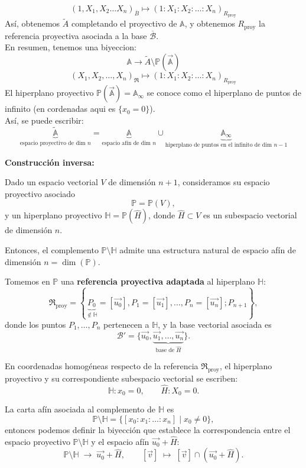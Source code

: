 \[
(1, X_1, X_2 \ldots X_n)_{\overline{B}} \mapsto 
(1 : X_1 : X_2 : \ldots : X_n)_{R_{\text{proy}}}
\]
Así, obtenemos $\widetilde{A}$ completando el proyectivo de $\mathbb{A}$, y obtenemos $R_{\text{proy}}$ la referencia proyectiva asociada a la base $\overline{\mathcal{B}}$.\\
En resumen, tenemos una biyeccion:
\[
\mathbb{A} \to \widetilde{A} \setminus \mathbb{P}(\vec{\mathbb{A}})
\]
\[
(X_1, X_2, \ldots, X_n)_{\mathfrak{R}} \mapsto 
(1 : X_1 : X_2 : \ldots : X_n)_{R_{\text{proy}}}
\]
El hiperplano proyectivo $\mathbb{P}(\vec{\mathbb{A}}) = \mathbb{A}_{\infty}$ se conoce como el hiperplano de puntos de infinito (en cordenadas aqui es $\{x_0 = 0\}$).\\
Así, se puede escribir:
\[
\underbrace{\widetilde{\mathbb{A}}}_{\text{espacio proyectivo de dim } n} =
\underbrace{\mathbb{A}}_{\text{espacio afín de dim } n} \cup
\underbrace{\mathbb{A}_{\infty}}_{\text{hiperplano de puntos en el infinito de dim } n-1}
\]

\textbf{Construcción inversa: }


Dado un espacio vectorial \(V\) de dimensión \(n+1\), consideramos su espacio proyectivo asociado
\[
\mathbb{P} = \mathbb{P}(V),
\]
y un hiperplano proyectivo \(\mathbb{H} = \mathbb{P}(\hat{H})\), donde \(\hat{H} \subset V\) es un subespacio vectorial de dimensión \(n\).

\medskip

Entonces, el complemento \(\mathbb{P} \setminus \mathbb{H}\) admite una estructura natural de espacio afín de dimensión \(n = \dim(\mathbb{P})\).

\medskip

Tomemos en \(\mathbb{P}\) una \textbf{referencia proyectiva adaptada} al hiperplano \(\mathbb{H}\):
\[
\mathfrak{R}_{\text{proy}} = 
\left\{
\underbrace{P_0}_{\notin \mathbb{H}} = [\vec{u_0}], 
P_1 = [\vec{u_1}], \ldots, P_n = [\vec{u_n}]; 
P_{n+1}
\right\},
\]
donde los puntos \(P_1, \ldots, P_n\) pertenecen a \(\mathbb{H}\), y la base vectorial asociada es
\[
\mathcal{B}' = \{ \vec{u_0}, \underbrace{\vec{u_1}, \ldots, \vec{u_n}}_{\text{base de } \hat{H}} \}.
\]

\medskip

En coordenadas homogéneas respecto de la referencia \(\mathfrak{R}_{\text{proy}}\), el hiperplano proyectivo y su correspondiente subespacio vectorial se escriben:
\[
\mathbb{H} : x_0 = 0, 
\qquad 
\hat{H} : X_0 = 0.
\]

La carta afín asociada al complemento de \(\mathbb{H}\) es
\[
\mathbb{P} \setminus \mathbb{H} = \{ [x_0 : x_1 : \ldots : x_n] \mid x_0 \neq 0 \},
\]
entonces podemos definir la biyección que establece la correspondencia entre el espacio proyectivo $\mathbb{P} \setminus \mathbb{H}$ y el espacio afín $\vec{u_0} + \hat{H}$:
\[
\mathbb{P} \setminus \mathbb{H} \;\longrightarrow\; \vec{u_0} + \hat{H}, 
\qquad 
[\vec{v}] \;\longmapsto\; [\vec{v}] \cap (\vec{u_0} + \hat{H}).
\]

